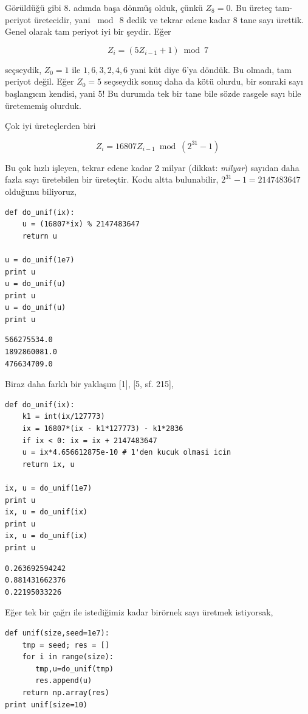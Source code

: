 \documentclass[12pt,fleqn]{article}\usepackage{../../common}
\begin{document}
Görüldüğü gibi 8. adımda başa dönmüş olduk, çünkü $Z_8 = 0$. Bu üreteç
tam-periyot üretecidir, yani $\bmod \ 8$ dedik ve tekrar edene kadar 8 tane
sayı ürettik. Genel olarak tam periyot iyi bir şeydir. Eğer 

$$ Z_i = (5 Z_{i-1} + 1) \bmod 7$$

seçseydik, $Z_0=1$ ile $1,6,3,2,4,6$ yani küt diye 6'ya döndük. Bu olmadı, tam
periyot değil. Eğer $Z_0=5$ seçseydik sonuç daha da kötü olurdu, bir sonraki
sayı başlangıcın kendisi, yani 5! Bu durumda tek bir tane bile sözde rasgele
sayı bile üretememiş olurduk.

Çok iyi üreteçlerden biri

$$ Z_i = 16807 Z_{i-1} \bmod (2^{31}-1)$$

Bu çok hızlı işleyen, tekrar edene kadar 2 milyar (dikkat: {\em milyar})
sayıdan daha fazla sayı üretebilen bir üreteçtir. Kodu altta
bulunabilir, $2^{31}-1=2147483647$ olduğunu biliyoruz,

\begin{verbatim}
def do_unif(ix): 
    u = (16807*ix) % 2147483647
    return u

u = do_unif(1e7)
print u
u = do_unif(u)
print u
u = do_unif(u)
print u
\end{verbatim}

\begin{verbatim}
566275534.0
1892860081.0
476634709.0
\end{verbatim}

Biraz daha farklı bir yaklaşım [1], [5, sf. 215],

\begin{verbatim}
def do_unif(ix): 
    k1 = int(ix/127773)
    ix = 16807*(ix - k1*127773) - k1*2836
    if ix < 0: ix = ix + 2147483647
    u = ix*4.656612875e-10 # 1'den kucuk olmasi icin
    return ix, u

ix, u = do_unif(1e7)
print u
ix, u = do_unif(ix)
print u
ix, u = do_unif(ix)
print u
\end{verbatim}

\begin{verbatim}
0.263692594242
0.881431662376
0.22195033226
\end{verbatim}

Eğer tek bir çağrı ile istediğimiz kadar birörnek sayı üretmek istiyorsak,

\begin{verbatim}
def unif(size,seed=1e7):
    tmp = seed; res = []
    for i in range(size):
       tmp,u=do_unif(tmp)
       res.append(u)
    return np.array(res)
print unif(size=10)
\end{verbatim}
\end{document}
